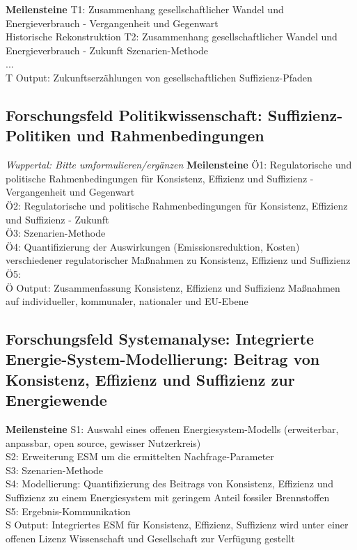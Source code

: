 \documentclass[a4paper,11pt,twoside]{scrartcl}
\begin{document}
\textbf{Meilensteine}
T1: Zusammenhang gesellschaftlicher Wandel und Energieverbrauch - Vergangenheit und Gegenwart\\ Historische Rekonstruktion
T2: Zusammenhang gesellschaftlicher Wandel und Energieverbrauch - Zukunft Szenarien-Methode\\
...\\
T Output: Zukunftserzählungen von gesellschaftlichen Suffizienz-Pfaden

\subsection*{Forschungsfeld Politikwissenschaft: Suffizienz-Politiken und Rahmenbedingungen}
\textit{Wuppertal: Bitte umformulieren/ergänzen}
\textbf{Meilensteine}
Ö1: Regulatorische und politische Rahmenbedingungen für Konsistenz, Effizienz und Suffizienz - Vergangenheit und Gegenwart\\
Ö2: Regulatorische und politische Rahmenbedingungen für Konsistenz, Effizienz und Suffizienz - Zukunft\\
Ö3: Szenarien-Methode\\
Ö4: Quantifizierung der Auswirkungen (Emissionsreduktion, Kosten) verschiedener regulatorischer Maßnahmen zu Konsistenz, Effizienz und Suffizienz\\
Ö5: \\
Ö Output: Zusammenfassung Konsistenz, Effizienz und Suffizienz Maßnahmen auf individueller, kommunaler, nationaler und EU-Ebene

\subsection*{Forschungsfeld Systemanalyse: Integrierte Energie-System-Modellierung: Beitrag von Konsistenz, Effizienz und Suffizienz zur Energiewende}

\textbf{Meilensteine}
S1: Auswahl eines offenen Energiesystem-Modells (erweiterbar, anpassbar, open source, gewisser Nutzerkreis)\\
S2: Erweiterung ESM um die ermittelten Nachfrage-Parameter\\
S3: Szenarien-Methode\\
S4: Modellierung: Quantifizierung des Beitrags von Konsistenz, Effizienz und Suffizienz zu einem Energiesystem mit geringem Anteil fossiler Brennstoffen\\
S5: Ergebnis-Kommunikation\\
S Output: Integriertes ESM für Konsistenz, Effizienz, Suffizienz wird unter einer offenen Lizenz Wissenschaft und Gesellschaft zur Verfügung gestellt
\end{document}
